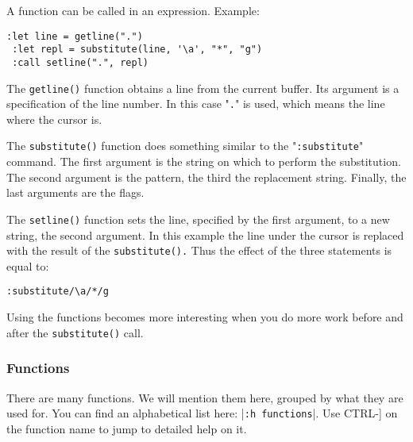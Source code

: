 A function can be called in an expression.
Example:

\begin{Verbatim}[samepage=true]
 :let line = getline(".")
 :let repl = substitute(line, '\a', "*", "g")
 :call setline(".", repl)
\end{Verbatim}

The \verb!getline()! function obtains a line from the current buffer.
Its argument is a specification of the line number.
In this case "\verb!.!" is used, which means the line where the cursor is.

The \verb!substitute()! function does something similar to the "\verb!:substitute!" command.
The first argument is the string on which to perform the substitution.
The second argument is the pattern, the third the replacement string.
Finally, the last arguments are the flags.

The \verb!setline()! function sets the line, specified by the first argument, to a new string, the second argument.
In this example the line under the cursor is replaced with the result of the \verb!substitute().!  Thus the effect of the three statements is equal to:

\begin{Verbatim}[samepage=true]
 :substitute/\a/*/g
\end{Verbatim}

Using the functions becomes more interesting when you do more work before and after the \verb!substitute()! call.

\subsubsection{Functions}
\label{function-list}
There are many functions.
We will mention them here, grouped by what they are used for.
You can find an alphabetical list here: |\verb!:h functions!|.
Use CTRL-] on the function name to jump to detailed help on it.

